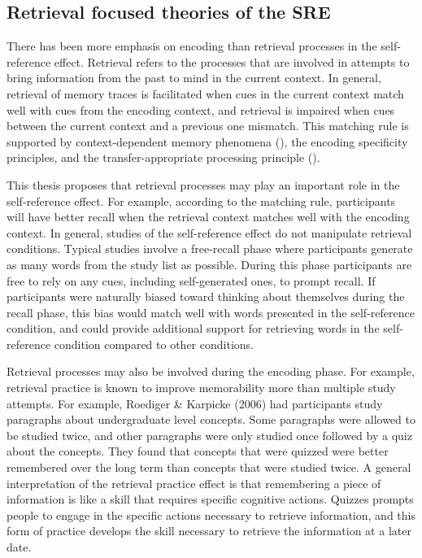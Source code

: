 \documentclass[
  man,floatsintext]{apa6}
\begin{document}
\hypertarget{retrieval-focused-theories-of-the-sre}{%
\subsection{Retrieval focused theories of the SRE}\label{retrieval-focused-theories-of-the-sre}}

There has been more emphasis on encoding than retrieval processes in the self-reference effect. Retrieval refers to the processes that are involved in attempts to bring information from the past to mind in the current context. In general, retrieval of memory traces is facilitated when cues in the current context match well with cues from the encoding context, and retrieval is impaired when cues between the current context and a previous one mismatch. This matching rule is supported by context-dependent memory phenomena (), the encoding specificity principles, and the transfer-appropriate processing principle ().

This thesis proposes that retrieval processes may play an important role in the self-reference effect. For example, according to the matching rule, participants will have better recall when the retrieval context matches well with the encoding context. In general, studies of the self-reference effect do not manipulate retrieval conditions. Typical studies involve a free-recall phase where participants generate as many words from the study list as possible. During this phase participants are free to rely on any cues, including self-generated ones, to prompt recall. If participants were naturally biased toward thinking about themselves during the recall phase, this bias would match well with words presented in the self-reference condition, and could provide additional support for retrieving words in the self-reference condition compared to other conditions.

Retrieval processes may also be involved during the encoding phase. For example, retrieval practice is known to improve memorability more than multiple study attempts. For example, Roediger \& Karpicke (2006) had participants study paragraphs about undergraduate level concepts. Some paragraphs were allowed to be studied twice, and other paragraphs were only studied once followed by a quiz about the concepts. They found that concepts that were quizzed were better remembered over the long term than concepts that were studied twice. A general interpretation of the retrieval practice effect is that remembering a piece of information is like a skill that requires specific cognitive actions. Quizzes prompts people to engage in the specific actions necessary to retrieve information, and this form of practice develops the skill necessary to retrieve the information at a later date.
\end{document}
